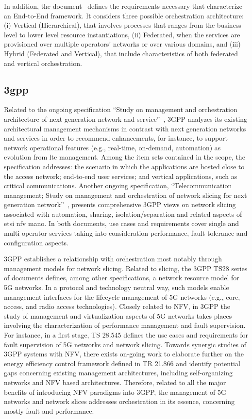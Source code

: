 In addition, the document~\cite{NGMNAlliance2018} defines the requirements necessary that characterize an End-to-End framework. It considers three possible orchestration architecture: (i) Vertical (Hierarchical), that involves processes that ranges from the business level to lower level resource instantiations, (ii) Federated, when the services are provisioned over multiple operators’ networks or over various domains, and (iii) Hybrid (Federated and Vertical), that include characteristics of both federated and vertical orchestration.  


\subsection{\acrfull{3gpp}}
Related to the ongoing specification ``Study on management and orchestration architecture of next generation network and service''~\cite{3gppStudy:28800:2017}, 3GPP analyzes its existing architectural management mechanisms in contrast with next generation networks and services in order to recommend enhancements, for instance, to support network operational features (e.g., real-time, on-demand, automation) as evolution from \gls{lte} management. Among the item sets contained in the scope, the specification addresses: the scenario in which the applications are hosted close to the access network; end-to-end user services; and vertical applications, such as critical communications. 
Another ongoing specification, ``Telecommunication management; Study on management and orchestration of network slicing for next generation network''~\cite{3GPP2017TRNetwork}, presents comprehensive 3GPP views on network slicing associated with automation, sharing, isolation/separation and related aspects of \gls{etsi} \gls{nfv} \gls{mano}. In both documents, use cases and requirements cover single and multi-operator services taking into consideration performance, fault tolerance and configuration aspects.

3GPP establishes a relationship with orchestration most notably through management models for network slicing. Related to slicing, the 3GPP TS28 series of documents defines, among other specifications, a network resource model for 5G networks. 
In a protocol and technology neutral way, such models enable management interfaces for the lifecycle management of 5G networks (e.g., core, access, and radio access technologies). 
Closely related to NFV, in 3GPP the study of management and virtualization aspects of 5G networks takes places involving the characterization of performance management and fault supervision.
For instance, in a first stage, TS 28.545 defines the use cases and requirements for fault supervision of 5G networks and network slicing.
Towards synergic studies of 3GPP systems with NFV, there exists on-going work to elaborate further on the energy efficiency control framework defined in TR 21.866 and identify potential gaps concerning existing management architectures, including self-organizing networks and NFV based architectures.
Therefore, related to all the major benefits of introducing NFV paradigms into 3GPP, the management of 5G networks and network slices addresses orchestration in its essence, concerning mostly fault and performance.

